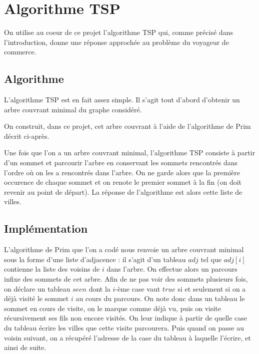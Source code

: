 \documentclass{article}
\begin{document}
\section{Algorithme TSP}
On utilise au coeur de ce projet l'algorithme TSP qui, comme précisé dans l'introduction, donne une réponse approchée au problème du voyageur de commerce.

\subsection{Algorithme}
L'algorithme TSP est en fait assez simple. Il s'agit tout d'abord d'obtenir un arbre couvrant minimal du graphe considéré.


On construit, dans ce projet, cet arbre couvrant à l'aide de l'algorithme de Prim décrit ci-après.

Une fois que l'on a un arbre couvrant minimal, l'algorithme TSP consiste à partir d'un sommet et parcourir l'arbre en conservant les sommets rencontrés dans l'ordre où 
on les a rencontrés dans l'arbre. On ne garde alors que la première occurence de chaque sommet et on renote le premier sommet à la fin (on doit revenir au point de 
départ). La réponse de l'algorithme est alors cette liste de villes.

\subsection{Implémentation}
L'algorithme de Prim que l'on a codé nous renvoie un arbre couvrant minimal sous la forme d'une liste d'adjacence : il s'agit d'un tableau $adj$ tel que
$adj[i]$ contienne la liste des voisins de $i$ dans l'arbre.
On effectue alors un parcours infixe
des sommets de cet arbre. Afin de ne pas voir des sommets plusieurs fois, on déclare un tableau $seen$ dont la $i$-ème case vaut $true$ si et seulement si on a déjà
visité le sommet $i$ au cours du parcours. On note donc dans un tableau le sommet en cours de visite, on le marque comme déjà vu, puis on visite récursivement ses 
fils non encore visités. On leur indique à partir de quelle case du tableau écrire les villes que cette visite parcourera. Puis quand on passe au voisin suivant, on a
récupéré l'adresse de la case du tableau à laquelle l'écrire, et ainsi de suite.

\end{document}
